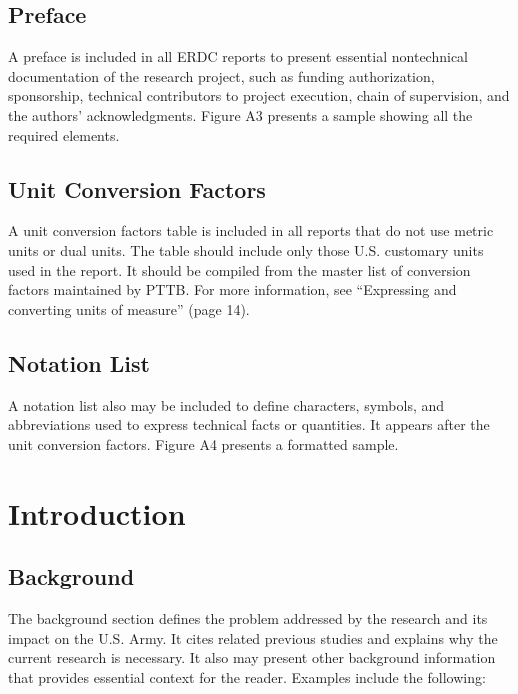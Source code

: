 \documentclass[]{book}
\theoremstyle{definition}
\theoremstyle{definition}
\theoremstyle{definition}
\theoremstyle{remark}
\begin{document}
\section{Preface}\label{preface}

A preface is included in all ERDC reports to present essential
nontechnical documentation of the research project, such as funding
authorization, sponsorship, technical contributors to project execution,
chain of supervision, and the authors' acknowledgments. Figure A3
presents a sample showing all the required elements.

\section{Unit Conversion Factors}\label{unit-conversion-factors}

A unit conversion factors table is included in all reports that do not
use metric units or dual units. The table should include only those U.S.
customary units used in the report. It should be compiled from the
master list of conversion factors maintained by PTTB. For more
information, see ``Expressing and converting units of measure'' (page
14).

\section{Notation List}\label{notation-list}

A notation list also may be included to define characters, symbols, and
abbreviations used to express technical facts or quantities. It appears
after the unit conversion factors. Figure A4 presents a formatted
sample. \citet{R-base}

\chapter{Introduction}\label{introduction}

\section{Background}\label{background}

The background section defines the problem addressed by the research and
its impact on the U.S. Army. It cites related previous studies and
explains why the current research is necessary. It also may present
other background information that provides essential context for the
reader. Examples include the following:
\end{document}
